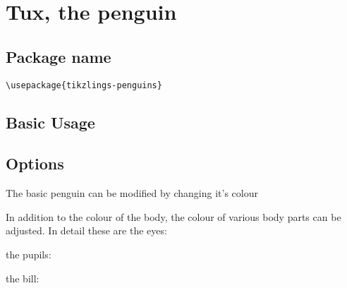 \documentclass[parskip=half]{scrartcl}
\begin{document}

\clearpage
\section[Penguin]{Tux, the penguin}

\subsection{Package name}

\begin{tcolorbox}[lower separated=false, lefthand width=.8\linewidth]
\vspace*{0.5cm}
\lstinline|\usepackage{tikzlings-penguins}|
\vspace*{0.5cm}
\end{tcolorbox}

\subsection{Basic Usage}

\begin{tcblisting}{}
\penguin
\end{tcblisting}

\subsection{Options}

The basic penguin can be modified by changing it's colour

\begin{tcblisting}{}
\penguin[body=SteelBlue]
\end{tcblisting}

In addition to the colour of the body, the colour of various body parts can be adjusted. In detail these are the eyes:

\begin{tcblisting}{}
\penguin[eye=red]
\end{tcblisting}

the pupils:

\begin{tcblisting}{}
\penguin[pupil=red]
\end{tcblisting}

the bill:

\begin{tcblisting}{}
\penguin[bill=red]
\end{tcblisting}
\end{document}

